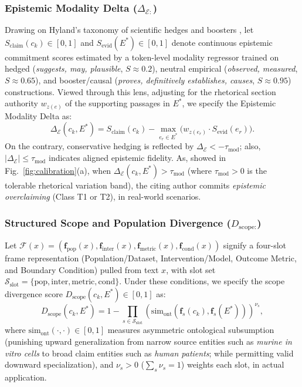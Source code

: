 \documentclass[journal]{IEEEtran}
\begin{document}
\subsubsection{Epistemic Modality Delta (\texorpdfstring{$\Delta_{\mathcal{E:}}$}{Delta E})}
Drawing on Hyland's taxonomy of scientific hedges and boosters \cite{hyland1998hedging}, let $S_{\text{claim}}(c_k) \in [0, 1]$ and $S_{\text{evid}}(E^*) \in [0, 1]$ denote continuous epistemic commitment scores estimated by a token-level modality regressor trained on hedged (\emph{suggests, may, plausible}, $S \approx 0.2$), neutral empirical (\emph{observed, measured}, $S \approx 0.65$), and booster/causal (\emph{proves, definitively establishes, causes}, $S \approx 0.95$) constructions. Viewed through this lens, adjusting for the rhetorical section authority $w_{z(e)}$ of the supporting passages in $E^*$, we specify the Epistemic Modality Delta as:
\begin{equation}
\Delta_{\mathcal{E}}(c_k, E^*) = S_{\text{claim}}(c_k) - \max_{e_r \in E^*} \Big( w_{z(e_r)} \cdot S_{\text{evid}}(e_r) \Big).
\label{eq:epistemic_delta}
\end{equation}
On the contrary, conservative hedging is reflected by $\Delta_{\mathcal{E}} < -\tau_{\text{mod}}$; also, $|\Delta_{\mathcal{E}}| \leq \tau_{\text{mod}}$ indicates aligned epistemic fidelity. As, showed in Fig.~\ref{fig:calibration}(a), when $\Delta_{\mathcal{E}}(c_k, E^*) > \tau_{\text{mod}}$ (where $\tau_{\text{mod}} > 0$ is the tolerable rhetorical variation band), the citing author commits \emph{epistemic overclaiming} (Class T1 or T2), in real-world scenarios.

\subsubsection{Structured Scope and Population Divergence (\texorpdfstring{$D_{\text{scope:}}$}{D scope})}
Let $\mathcal{F}(x) = (\mathbf{f}_{\text{pop}}(x), \mathbf{f}_{\text{inter}}(x), \mathbf{f}_{\text{metric}}(x), \mathbf{f}_{\text{cond}}(x))$ signify a four-slot frame representation (Population/Dataset, Intervention/Model, Outcome Metric, and Boundary Condition) pulled from text $x$, with slot set $\mathcal{S}_{\text{slot}} = \{\text{pop}, \text{inter}, \text{metric}, \text{cond}\}$. Under these conditions, we specify the scope divergence score $D_{\text{scope}}(c_k, E^*) \in [0, 1]$ as:
\begin{equation}
D_{\text{scope}}(c_k, E^*) = 1 - \prod_{s \in \mathcal{S}_{\text{slot}}} \left( \text{sim}_{\text{ont}}\!\left(\mathbf{f}_s(c_k), \mathbf{f}_s(E^*)\right) \right)^{\nu_s},
\label{eq:scope_div}
\end{equation}
where $\text{sim}_{\text{ont}}(\cdot, \cdot) \in [0, 1]$ measures asymmetric ontological subsumption (punishing upward generalization from narrow source entities such as \emph{murine in vitro cells} to broad claim entities such as \emph{human patients}; while permitting valid downward specialization), and $\nu_s > 0$ ($\sum_s \nu_s = 1$) weights each slot, in actual application.
\end{document}

